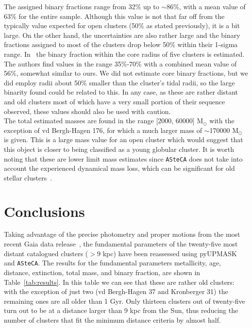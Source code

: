 \documentclass{aa}
\begin{document}
  The assigned binary fractions range from 32\% up to $\sim86$\%, 
  with a mean value of 63\% for the entire sample. Although this value
  is not that far off from the typically value expected for open clusters (50\%
  as stated previously), it is a bit large. On the other hand, the
  uncertainties are also rather large and the binary fractions assigned to
  most of the clusters drop below 50\% within their 1-sigma range.
  In~\cite{Sollima_2010} the binary fraction within the core radius of five
  clusters is estimated. The authors find values in the range 35\%-70\% with a
  combined mean value of 56\%, somewhat similar to ours. We did not estimate
  core binary fractions, but we did employ radii about 50\% smaller than the
  cluster's tidal radii, so the large binarity found could be related to this.
  In any case, as these are rather distant and old clusters most of which have
  a very small portion of their sequence observed, these values should also be
  used with caution.\\

  The total estimated masses are found in the range [2000, 60000] M$_{\odot}$
  with the exception of vd Bergh-Hagen 176, for which a much
  larger mass of $\sim$170000 M$_{\odot}$ is given. This is a large mass
  value for an open cluster which would suggest that this object is closer to
  being classified as a young globular cluster.
  It is worth noting that these are lower limit mass
  estimates since \texttt{ASteCA} does not take into account the
  experienced dynamical mass loss, which can be significant for old stellar
  clusters~\citep{Martinez_2017}.\\







\section{Conclusions}
 \label{sec:conclusions}

  Taking advantage of the precise photometry and proper motions from the
  most recent Gaia data release~\citep{Gaia_EDR3}, the fundamental parameters
  of the twenty-five most distant catalogued clusters ($>9$ kpc) have been
  reassessed using pyUPMASK and \texttt{ASteCA}.
  The results for the fundamental parameters metallicity, age, distance,
  extinction, total mass, and binary fraction, are shown in 
  Table~\ref{tab:results}. In this table we can see that these are
  rather old clusters: with the exception of just two (vd Bergh-Hagen 37 and
  Kronberger 31) the remaining ones are all older than 1 Gyr.
  Only thirteen clusters out of twenty-five turn out to be at a distance larger
  than 9 kpc from the Sun, thus reducing the number of clusters that fit the
  minimum distance criteria by almost half.
\end{document}
